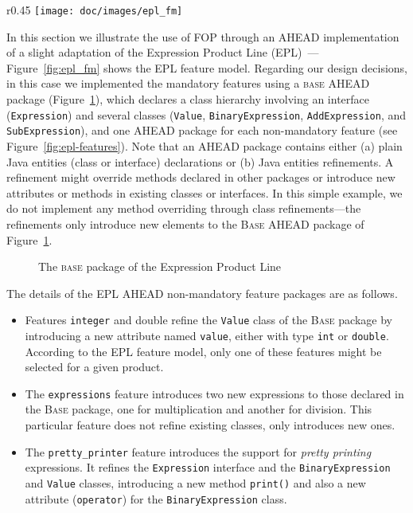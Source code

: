 \begin{wrapfigure}{r}{0.45\textwidth}
\centering
\texttt{[image: doc/images/epl\_fm]}
\label{fig:epl_fm}
\caption{EPL feature model} 
\end{wrapfigure} 


In this section we illustrate the use of FOP through an AHEAD implementation 
of a slight adaptation of the Expression Product Line (EPL)~\cite{}---Figure~\ref{fig:epl_fm} shows 
the EPL feature model. Regarding our design decisions, 
in this case we implemented the mandatory features using a \textsc{base} AHEAD package (Figure~\ref{fig:epl-base}), which
declares a class hierarchy involving an interface (\texttt{Expression}) and
several classes (\texttt{Value}, \texttt{BinaryExpression}, \texttt{AddExpression}, and 
\texttt{SubExpression}), and one AHEAD package for each non-mandatory feature (see Figure~\ref{fig:epl-features}). Note 
that an AHEAD package contains either (a) plain Java entities (class or interface) declarations or (b) 
Java entities refinements. A refinement 
might override methods declared in other packages or 
introduce new attributes or methods in existing classes 
or interfaces. In this simple example, we do not implement any 
method overriding through class refinements---the refinements 
only introduce new elements to the \textsc{Base} AHEAD package 
of Figure~\ref{fig:epl-base}.  

\begin{figure}[htb]
\label{fig:epl-base}
\caption{The \textsc{base} package of the Expression Product Line}
\end{figure} 

The details of the EPL AHEAD non-mandatory feature packages are as follows. 

\begin{itemize}
\item Features \texttt{integer} and {double} refine the \texttt{Value} class of 
the \textsc{Base} package by introducing a new attribute named 
\texttt{value}, either with type \texttt{int} or \texttt{double}. According 
to the EPL feature model, only one of these features might be selected for 
a given product. 

\item The \texttt{expressions} feature introduces two new expressions 
to those declared in the \textsc{Base} package, one for multiplication 
and another for division. This particular feature does not refine 
existing classes, only introduces new ones. 

\item The \texttt{pretty\_printer} feature introduces the support for 
\emph{pretty printing} expressions. It refines the \texttt{Expression} 
interface and the \texttt{BinaryExpression} and \texttt{Value} classes, 
introducing a new method \texttt{print()} and also a 
new attribute (\texttt{operator}) for the \texttt{BinaryExpression} class.

\end{itemize}



